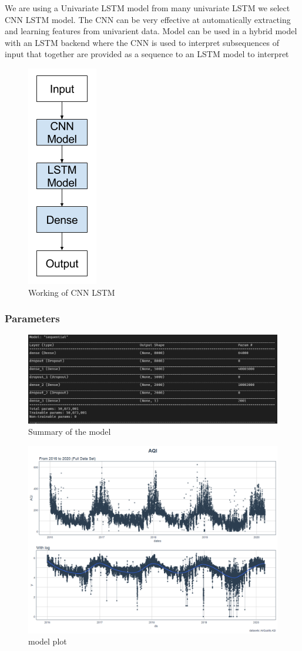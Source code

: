 We are using a Univariate LSTM model from many univariate LSTM we select CNN LSTM model.
The CNN can be very effective at automatically extracting and learning features from univarient data. Model can be used in a hybrid model with an LSTM backend where the CNN is used to interpret subsequences of input that together are provided as a sequence to an LSTM model to interpret
\begin{figure}[h]
\label{bd}
\centering
\includegraphics[width= 2.2 cm]{lstm_org.png}
\caption{Working of CNN LSTM}
\end{figure}

\subsubsection{Parameters}

\begin{figure}[h]
\label{bd}
\centering
\includegraphics[width= 15 cm]{lstm_para.jpg}
\caption{Summary of the model}
\end{figure}
\begin{figure}[h]
\label{bd}
\centering
\includegraphics[width= 14 cm]{proph.png}
\caption{model plot}
\end{figure}

